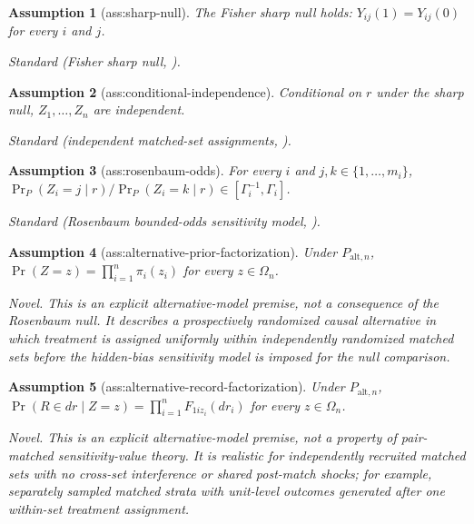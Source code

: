 \documentclass{article}
\newtheorem{assumption}{Assumption}
\begin{document}
\begin{assumption}[ass:sharp-null]\label{ass:sharp-null}
The Fisher sharp null holds: \(Y_{ij}(1)=Y_{ij}(0)\) for every \(i\) and \(j\).
\par\smallskip\noindent\emph{Standard} (Fisher sharp null, \cite{Rosenbaum1987SensitivityPermutation}).
\end{assumption}

\begin{assumption}[ass:conditional-independence]\label{ass:conditional-independence}
Conditional on \(r\) under the sharp null, \(Z_1,\ldots,Z_n\) are independent.
\par\smallskip\noindent\emph{Standard} (independent matched-set assignments, \cite{Rosenbaum1987SensitivityPermutation}).
\end{assumption}

\begin{assumption}[ass:rosenbaum-odds]\label{ass:rosenbaum-odds}
For every \(i\) and \(j,k\in\{1,\ldots,m_i\}\), \(\Pr_P(Z_i=j\mid r)/\Pr_P(Z_i=k\mid r)\in[\Gamma_i^{-1},\Gamma_i]\).
\par\smallskip\noindent\emph{Standard} (Rosenbaum bounded-odds sensitivity model, \cite{Rosenbaum1987SensitivityPermutation}).
\end{assumption}

\begin{assumption}[ass:alternative-prior-factorization]\label{ass:alternative-prior-factorization}
Under \(P_{\mathrm{alt},n}\), \(\Pr(Z=z)=\prod_{i=1}^n\pi_i(z_i)\) for every \(z\in\Omega_n\).
\par\smallskip\noindent\emph{Novel.} This is an explicit alternative-model premise, not a consequence of the Rosenbaum null. It describes a prospectively randomized causal alternative in which treatment is assigned uniformly within independently randomized matched sets before the hidden-bias sensitivity model is imposed for the null comparison.
\end{assumption}

\begin{assumption}[ass:alternative-record-factorization]\label{ass:alternative-record-factorization}
Under \(P_{\mathrm{alt},n}\), \(\Pr(R\in dr\mid Z=z)=\prod_{i=1}^nF_{1i z_i}(dr_i)\) for every \(z\in\Omega_n\).
\par\smallskip\noindent\emph{Novel.} This is an explicit alternative-model premise, not a property of pair-matched sensitivity-value theory. It is realistic for independently recruited matched sets with no cross-set interference or shared post-match shocks; for example, separately sampled matched strata with unit-level outcomes generated after one within-set treatment assignment.
\end{assumption}
\end{document}
